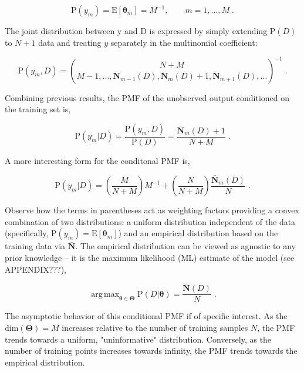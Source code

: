 \documentclass[12pt]{article}
\DeclareMathOperator*{\argmax}{arg\,max}
\begin{document}
\begin{equation}
\text{P}(y_m) = \text{E}[\bm{\theta}_m] = M^{-1}, \qquad m=1,\ldots,M \;.
\end{equation}

The joint distribution between $\mathrm{y}$ and $\mathrm{D}$ is expressed by simply extending $\text{P}(D)$ to $N+1$ data and treating $y$ separately in the multinomial coefficient:

\begin{equation}
\text{P}(y_m,D) = \binom{N+M}{M-1,\ldots,\bar{\bm{N}}_{m-1}(D),\bar{\bm{N}}_m(D)+1,\bar{\bm{N}}_{m+1}(D),\ldots}^{-1} \;.
\end{equation}

Combining previous results, the PMF of the unobserved output conditioned on the training set is,

\begin{equation}
\text{P}(y_m | D) = \frac{\text{P}(y_m,D)}{\text{P}(D)} = \frac{\bar{\bm{N}}_m(D)+1}{N+M} \;.
\end{equation}

A more interesting form for the conditonal PMF is,

\begin{equation}
\text{P}(y_m | D) = \left(\frac{M}{N+M}\right) M^{-1} + \left(\frac{N}{N+M}\right) \frac{\bar{\bm{N}}_m(D)}{N} \;.
\end{equation}

Observe how the terms in parentheses act as weighting factors providing a convex combination of two distributions: a uniform distribution independent of the data (specifically, $\text{P}(y_m) = \text{E}[\bm{\theta}_m]$) and an empirical distribution based on the training data via $\bar{\bm{N}}$. The empirical distribution can be viewed as agnostic to any prior knowledge -- it is the maximum likelihood (ML) estimate of the model (see APPENDIX???),

\begin{equation}
\argmax_{\bm{\theta} \in \bm{\Theta}} \text{P}(D | \bm{\theta}) = \frac{\bar{\bm{N}}(D)}{N} \;.
\end{equation}

The asymptotic behavior of this conditional PMF if of specific interest. As the $\text{dim}(\bm{\Theta}) = M$ increases relative to the number of training samples $N$, the PMF trends towards a uniform, "uninformative" distribution. Conversely, as the number of training points increases towards infinity, the PMF trends towards the empirical distribution. 
\end{document}

